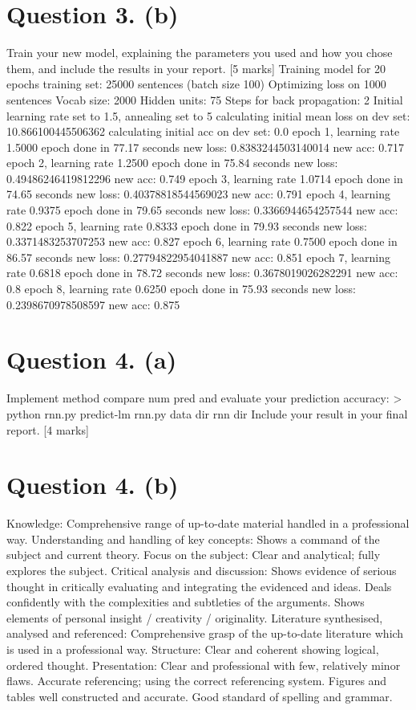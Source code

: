\documentclass{article}
\begin{document}
\section{Question 3. (b)}
Train your new model, explaining the parameters you used and how you chose them, and include the results in your report. [5 marks]
Training model for 20 epochs
training set: 25000 sentences (batch size 100)
Optimizing loss on 1000 sentences
Vocab size: 2000
Hidden units: 75
Steps for back propagation: 2
Initial learning rate set to 1.5, annealing set to 5
calculating initial mean loss on dev set: 10.866100445506362
calculating initial acc on dev set: 0.0
epoch 1, learning rate 1.5000	epoch done in 77.17 seconds	new loss: 0.8383244503140014	new acc: 0.717
epoch 2, learning rate 1.2500	epoch done in 75.84 seconds	new loss: 0.49486246419812296	new acc: 0.749
epoch 3, learning rate 1.0714	epoch done in 74.65 seconds	new loss: 0.40378818544569023	new acc: 0.791
epoch 4, learning rate 0.9375	epoch done in 79.65 seconds	new loss: 0.3366944654257544	new acc: 0.822
epoch 5, learning rate 0.8333	epoch done in 79.93 seconds	new loss: 0.3371483253707253	new acc: 0.827
epoch 6, learning rate 0.7500	epoch done in 86.57 seconds	new loss: 0.27794822954041887	new acc: 0.851
epoch 7, learning rate 0.6818	epoch done in 78.72 seconds	new loss: 0.3678019026282291	new acc: 0.8
epoch 8, learning rate 0.6250	epoch done in 75.93 seconds	new loss: 0.2398670978508597	new acc: 0.875

\section{Question 4. (a)}
Implement method compare num pred and evaluate your prediction accuracy: > python rnn.py predict-lm rnn.py data dir rnn dir
Include your result in your final report. [4 marks]

\section{Question 4. (b)}
Knowledge: Comprehensive range of up-to-date material handled in a professional way.
Understanding and handling of key concepts: Shows a command of the subject and current theory.
Focus on the subject: Clear and analytical; fully explores the subject.
Critical analysis and discussion: Shows evidence of serious thought in critically evaluating and integrating the evidenced and ideas. Deals confidently with the complexities and subtleties of the arguments. Shows elements of personal insight / creativity / originality.
Literature synthesised, analysed and referenced: Comprehensive grasp of the up-to-date literature which is used in a professional way.
Structure: Clear and coherent showing logical, ordered thought.
Presentation: Clear and professional with few, relatively minor flaws. Accurate referencing; using the correct referencing system. Figures and tables well constructed and accurate. Good standard of spelling and grammar.
\newpage



\newpage
\appendix
\end{document}
